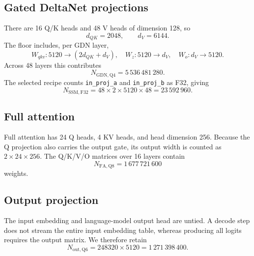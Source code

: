 \documentclass[11pt,a4paper]{article}
\begin{document}
\subsection{Gated DeltaNet projections}
There are 16 Q/K heads and 48 V heads of dimension 128, so
\begin{equation}
 d_{QK}=2048,\qquad d_V=6144.
\end{equation}
The floor includes, per GDN layer,
\[
W_{qkv}:5120\to(2d_{QK}+d_V),\quad
W_z:5120\to d_V,\quad
W_o:d_V\to5120.
\]
Across 48 layers this contributes
\begin{equation}
  N_{\mathrm{GDN,Q4}}=5\,536\,481\,280.
  \label{eq:gdn}
\end{equation}
The selected recipe counts \texttt{in\_proj\_a} and \texttt{in\_proj\_b} as F32, giving
\begin{equation}
  N_{\mathrm{SSM,F32}}=48\times2\times5120\times48
  =23\,592\,960.
  \label{eq:ssm}
\end{equation}

\subsection{Full attention}
Full attention has 24 Q heads, 4 KV heads, and head dimension 256. Because the Q projection also carries the output gate, its output width is counted as $2\times24\times256$. The Q/K/V/O matrices over 16 layers contain
\begin{equation}
  N_{\mathrm{FA,Q8}}=1\,677\,721\,600
  \label{eq:fa}
\end{equation}
weights.

\subsection{Output projection}
The input embedding and language-model output head are untied. A decode step does not stream the entire input embedding table, whereas producing all logits requires the output matrix. We therefore retain
\begin{equation}
  N_{\mathrm{out,Q6}}=248320\times5120
  =1\,271\,398\,400.
  \label{eq:out}
\end{equation}
\end{document}
